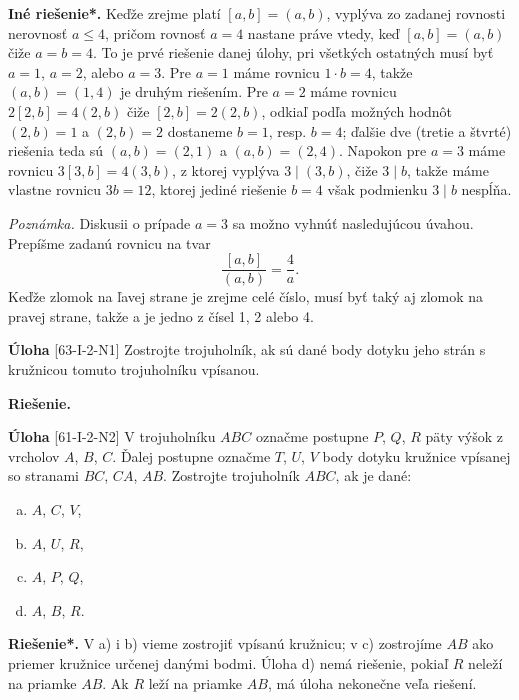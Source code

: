 \documentclass{article}
\newcommand{\rie}{\textbf{Riešenie.} }
\newcommand{\rieh}{\textbf{Riešenie*.} }
\newcommand{\problem}[3]{
  \begin{tcolorbox}[breakable,notitle,boxrule=0pt,colback=light-gray,colframe=light-gray]
    \textbf{Úloha}
    [#1] #2
  \end{tcolorbox}
  \noindent#3
}
\begin{document}
{\textbf{Iné riešenie*.} Keďže zrejme platí $[a, b] = (a, b)$, vyplýva zo zadanej rovnosti nerovnosť $a \leq 4$, pričom rovnosť $a = 4$ nastane práve vtedy, keď $[a, b] = (a, b)$ čiže $a = b = 4$. To je prvé riešenie danej úlohy, pri všetkých ostatných musí byť $a = 1$, $a = 2$, alebo $a = 3$. Pre $a = 1$ máme rovnicu $1 \cdot b = 4$, takže $(a, b) = (1, 4)$ je druhým riešením. Pre $a = 2$ máme rovnicu $2[2, b] = 4(2, b)$ čiže $[2, b] = 2(2, b)$, odkiaľ podľa možných hodnôt $(2, b) = 1$ a $(2, b) = 2$ dostaneme $b = 1$, resp. $b = 4$; ďalšie dve (tretie a štvrté) riešenia teda sú $(a, b) = (2, 1)$ a $(a, b) = (2, 4)$. Napokon pre $a = 3$ máme rovnicu $3[3, b] = 4(3, b)$, z ktorej vyplýva $3 \mid (3, b)$, čiže $3 \mid b$, takže máme vlastne rovnicu $3b = 12$, ktorej jediné riešenie $b = 4$ však podmienku $3 \mid b$ nespĺňa.

\textit{Poznámka.} Diskusii o prípade $a = 3$ sa možno vyhnúť nasledujúcou úvahou. Prepíšme zadanú rovnicu na tvar
$$\frac{[a, b]}{(a, b)}=\frac{4}{a}.$$
Keďže zlomok na ľavej strane je zrejme celé číslo, musí byť taký aj zlomok na pravej strane, takže a je jedno z čísel 1, 2 alebo 4.
}


\problem{63-I-2-N1}{
Zostrojte trojuholník, ak sú dané body dotyku jeho strán s kružnicou tomuto trojuholníku vpísanou.
}{
\rie
}


\problem{61-I-2-N2}{
V trojuholníku $ABC$ označme postupne $P$, $Q$, $R$ päty výšok z vrcholov $A$, $B$, $C$. Ďalej postupne označme $T$, $U$, $V$ body dotyku kružnice vpísanej so stranami $BC$, $CA$, $AB$.
Zostrojte trojuholník $ABC$, ak je dané:
\begin{enumerate}[a)]
    \item $A$, $C$, $V$,
    \item $A$, $U$, $R$,
    \item $A$, $P$, $Q$,
    \item $A$, $B$, $R$.
\end{enumerate}
}{
\rieh V a) i b) vieme zostrojiť vpísanú kružnicu; v c) zostrojíme $AB$ ako priemer kružnice určenej danými bodmi. Úloha d) nemá riešenie, pokiaľ $R$ neleží na priamke $AB$. Ak $R$ leží na priamke $AB$, má úloha nekonečne veľa riešení.
}
\end{document}
